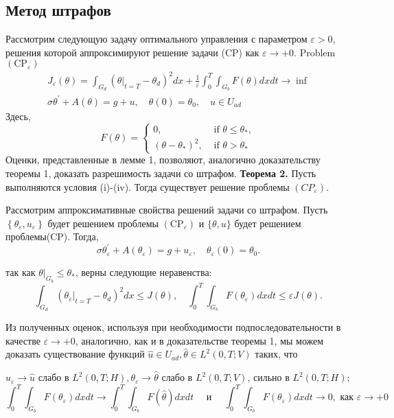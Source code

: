 \subsection{Метод штрафов}\label{subsec:ch3:sec3:subsec4}
Рассмотрим следующую задачу оптимального управления с параметром $\varepsilon>0$,
решения которой аппроксимируют решение задачи (CP) как $\varepsilon \rightarrow+0$.
Problem $\left(\mathrm{CP}_{\varepsilon}\right)$
\[
    \begin{gathered}
        J_{\varepsilon}(\theta)=\int_{G_{d}}
        \left(\left.\theta\right|_{t=T}-\theta_{d}\right)^{2} d x
        + \frac{1}{\varepsilon} \int_{0}^{T} \int_{G_{b}} F(\theta) d x d t \rightarrow \inf \\
        \sigma \theta^{\prime}+A(\theta)=g+u, \quad \theta(0)=\theta_{0}, \quad u \in U_{a d}
    \end{gathered}
\]
Здесь,
\[
    F(\theta)=
    \begin{cases}
        0, & \text { if } \theta \leq \theta_{*}, \\
        \left(\theta-\theta_{*}\right)^{2}, & \text { if } \theta>\theta_{*}
    \end{cases}
\]
Оценки, представленные в лемме 1, позволяют, аналогично
доказательству теоремы 1, доказать разрешимость задачи со штрафом.
\textbf{Теорема 2.} Пусть выполняются условия (i)-(iv).
Тогда существует решение проблемы $\left(C P_{\varepsilon}\right)$.

Рассмотрим аппроксимативные свойства решений задачи со штрафом.
Пусть $\left\{\theta_{\varepsilon}, u_{\varepsilon}\right\}$ будет решением проблемы
$\left(\mathrm{CP}_{\varepsilon}\right)$ и $\{\theta, u\}$ будет решением проблемы(CP).
Тогда,
\[
    \sigma \theta_{\varepsilon}^{\prime}+A\left(\theta_{\varepsilon}\right)=g+u_{\varepsilon},
    \quad \theta_{\varepsilon}(0)=\theta_{0}.
\]

так как $\left.\theta\right|_{G_{b}} \leq \theta_{*}$, верны следующие неравенства:
\[
    \int_{G_{d}}\left(\left.\theta_{\varepsilon}\right|_{t=T}-\theta_{d}\right)^{2} d x \leq J(\theta),
    \quad \int_{0}^{T} \int_{G_{b}} F\left(\theta_{\varepsilon}\right) d x d t \leq \varepsilon J(\theta).
\]

Из полученных оценок, используя при необходимости подпоследовательности в качестве
$\varepsilon \rightarrow+0$, аналогично, как и в доказательстве теоремы 1,
мы можем доказать существование функций
$\widehat{u} \in U_{a d}, \widehat{\theta} \in L^{2}(0, T ; V)$ таких, что

$u_{\varepsilon} \rightarrow \widehat{u}$ слабо в
$L^{2}(0, T ; H), \theta_{\varepsilon} \rightarrow \widehat{\theta}$ слабо в $L^{2}(0, T ; V)$,
сильно в $L^{2}(0, T ; H)$;
\[
    \int_{0}^{T} \int_{G_{b}} F\left(\theta_{\varepsilon}\right) d x d t \rightarrow \int_{0}^{T}
    \int_{G_{b}} F(\widehat{\theta}) dx dt \quad \text { и } \quad \int_{0}^{T} \int_{G_{b}}
    F\left(\theta_{\varepsilon}\right) dx dt \rightarrow 0, \text { как } \varepsilon \rightarrow+0
\]


